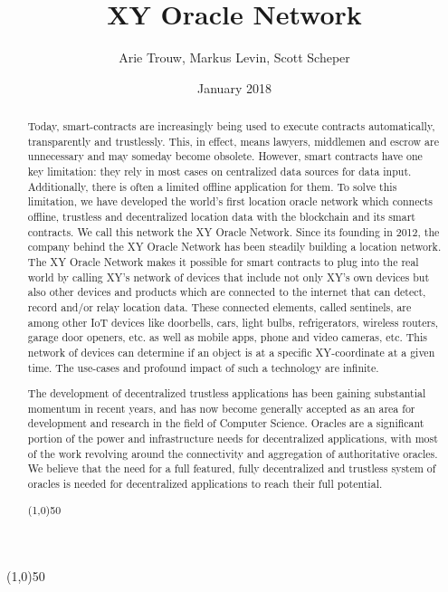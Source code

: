 \documentclass{article}
\title {XY Oracle Network}
\author{Arie Trouw, Markus Levin, Scott Scheper}
\date{January 2018}
\begin{document}
\maketitle
\tableofcontents

\begin{center}
\line(1,0){50}
\end{center}

\begin{abstract}
Today, \glspl{smart-contract} are increasingly being used to execute contracts automatically, transparently and trustlessly. This, in effect, means lawyers, middlemen and escrow are unnecessary and may someday become obsolete. However, smart contracts have one key limitation: they rely in most cases on centralized data sources for data input. Additionally, there is often a limited offline application for them. To solve this limitation, we have developed the world's first location \gls{oracle} network which connects offline, trustless and decentralized location data with the blockchain and its smart contracts. We call this network the XY Oracle Network. Since its founding in 2012, the company behind the XY Oracle Network has been steadily building a location network. The XY Oracle Network makes it possible for smart contracts to plug into the real world by calling XY's network of devices that include not only XY's own devices but also other devices and products which are connected to the internet that can detect, record and/or relay location data. These connected elements, called \Glspl{sentinel}, are among other IoT devices like doorbells, cars, light bulbs, refrigerators, wireless routers, garage door openers, etc. as well as mobile apps,  phone and video cameras, etc. This network of devices can determine if an object is at a specific XY-coordinate at a given time. The use-cases and profound impact of such a technology are infinite.

The development of decentralized trustless applications has been gaining substantial momentum in recent years, and has now become generally accepted as an area for development and research in the field of Computer Science. Oracles are a significant portion of the power and infrastructure needs for decentralized applications, with most of the work revolving around the connectivity and aggregation of authoritative oracles. We believe that the need for a full featured, fully decentralized and trustless system of oracles is needed for decentralized applications to reach their full potential.

\begin{center}
\line(1,0){50}
\end{center}

\end{abstract}
\end{document}
